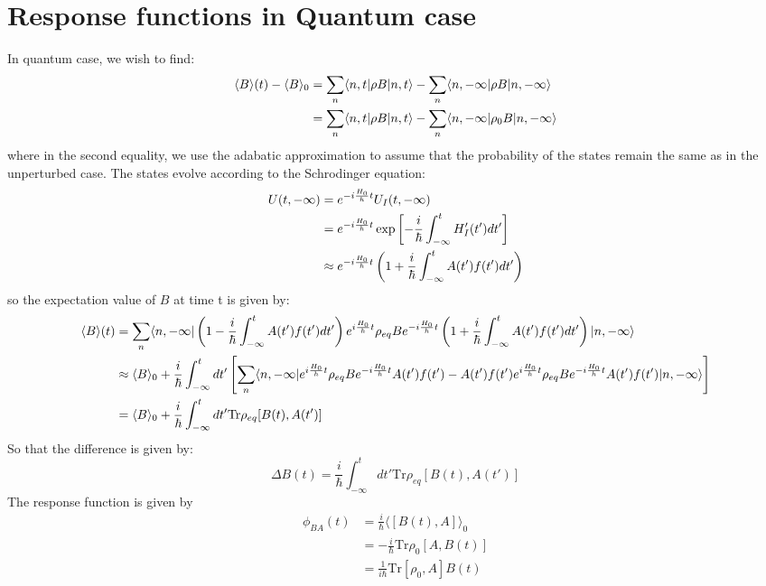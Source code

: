 \documentclass{article}
\begin{document}
\section{Response functions in Quantum case}
In quantum case, we wish to find:
\begin{align}
    \langle B \rangle(t) - \langle B \rangle_0 
    &= \sum_n \langle n, t | \rho B | n, t \rangle - \sum_n \langle n, -\infty | \rho B | n, -\infty \rangle \notag \\
    &= \sum_n \langle n, t | \rho B | n, t \rangle - \sum_n \langle n, -\infty | \rho_{0} B | n, -\infty \rangle
\end{align}
where in the second equality, we use the adabatic approximation to assume that the probability of 
the states remain the same as in the unperturbed case. The states evolve according to the Schrodinger equation:
\begin{align}
    U(t,-\infty) &= e^{-i\frac{H_0}{h}t} U_I(t,-\infty) \notag \\
                 &= e^{-i\frac{H_0}{h}t} \exp\left[ -\frac{i}{\hbar} \int_{-\infty}^{t} H_I'(t') dt'  \right] \notag \\
                 &\approx e^{-i\frac{H_0}{h}t} \left( 1 + \frac{i}{\hbar} \int_{-\infty}^{t} A(t')f(t') dt' \right)
\end{align}
so the expectation value of $B$ at time t is given by:
\begin{align}
    \langle B \rangle(t) &=
    \sum_n \langle n, -\infty | \left( 1 - \frac{i}{\hbar} \int_{-\infty}^{t} A(t')f(t') dt' \right) e^{i\frac{H_0}{h}t} \rho_{eq} B
    e^{-i\frac{H_0}{h}t} \left( 1 + \frac{i}{\hbar} \int_{-\infty}^{t} A(t')f(t') dt' \right) | n, -\infty \rangle \notag \\
    &\approx \langle B \rangle_0  + \frac{i}{\hbar} \int_{-\infty}^{t} dt' 
    \left[ \sum_n \langle n, -\infty | e^{i\frac{H_0}{h}t} \rho_{eq} B e^{-i\frac{H_0}{h}t} A(t')f(t') - A(t')f(t') e^{i\frac{H_0}{h}t} \rho_{eq} B e^{-i\frac{H_0}{h}t} A(t')f(t') | n, -\infty \rangle \right] \notag \\
    & = \langle B \rangle_0  + \frac{i}{\hbar} \int_{-\infty}^{t} dt' 
    \text{Tr} \rho_{eq} [B(t),A(t')]
\end{align}
So that the difference is given by:
\begin{equation}
    \Delta B(t) = \frac{i}{\hbar} \int_{-\infty}^{t} dt' \text{Tr} \rho_{eq} [B(t),A(t')]
\end{equation}
The response function is given by
\begin{align}
    \phi_{BA} (t) &=\frac{i}{\hbar} \langle [B(t),A] \rangle_0 \\
                &= -\frac{i}{\hbar} \text{Tr} \rho_0 [A, B(t)] \\
                &= \frac{1}{i\hbar} \text{Tr} [\rho_0, A] B(t)
\end{align}
\end{document}
